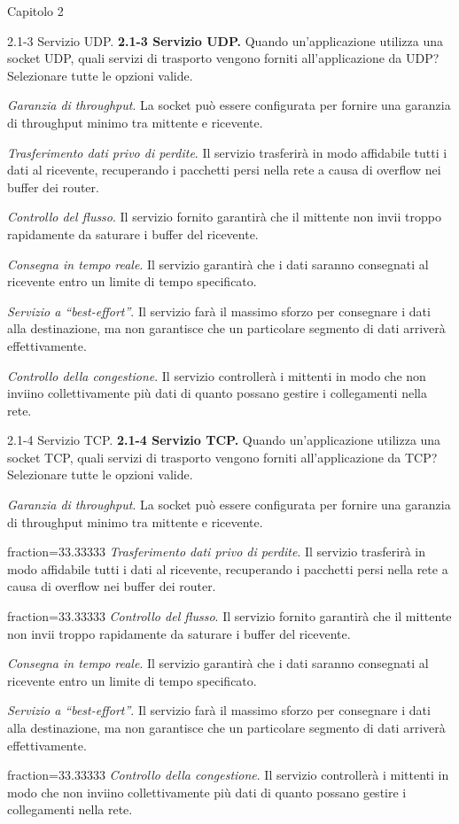\documentclass[a4paper]{article}
\begin{document}
\begin{quiz}{Capitolo 2}
\begin{multi}[points=1,shuffle,multiple]{2.1-3 Servizio UDP.}
\textbf{2.1-3 Servizio UDP.} Quando un'applicazione utilizza una socket UDP, quali servizi di trasporto vengono forniti all'applicazione da UDP? Selezionare tutte le opzioni valide.
\item \emph{Garanzia di throughput}. La socket può essere configurata per fornire una garanzia di throughput minimo tra mittente e ricevente.
\item \emph{Trasferimento dati privo di perdite}. Il servizio trasferirà in modo affidabile tutti i dati al ricevente, recuperando i pacchetti persi nella rete a causa di overflow nei buffer dei router.
\item \emph{Controllo del flusso}. Il servizio fornito garantirà che il mittente non invii troppo rapidamente da saturare i buffer del ricevente.
\item \emph{Consegna in tempo reale}. Il servizio garantirà che i dati saranno consegnati al ricevente entro un limite di tempo specificato.
\item* \emph{Servizio a ``best-effort''}. Il servizio farà il massimo sforzo per consegnare i dati alla destinazione, ma non garantisce che un particolare segmento di dati arriverà effettivamente.
\item \emph{Controllo della congestione}. Il servizio controllerà i mittenti in modo che non inviino collettivamente più dati di quanto possano gestire i collegamenti nella rete.
\end{multi}

\begin{multi}[points=1,shuffle,multiple]{2.1-4 Servizio TCP.}
\textbf{2.1-4 Servizio TCP.} Quando un'applicazione utilizza una socket TCP, quali servizi di trasporto vengono forniti all'applicazione da TCP? Selezionare tutte le opzioni valide.
\item \emph{Garanzia di throughput}. La socket può essere configurata per fornire una garanzia di throughput minimo tra mittente e ricevente.
\item[fraction=33.33333] \emph{Trasferimento dati privo di perdite}. Il servizio trasferirà in modo affidabile tutti i dati al ricevente, recuperando i pacchetti persi nella rete a causa di overflow nei buffer dei router.
\item[fraction=33.33333] \emph{Controllo del flusso}. Il servizio fornito garantirà che il mittente non invii troppo rapidamente da saturare i buffer del ricevente.
\item \emph{Consegna in tempo reale}. Il servizio garantirà che i dati saranno consegnati al ricevente entro un limite di tempo specificato.
\item \emph{Servizio a ``best-effort''}. Il servizio farà il massimo sforzo per consegnare i dati alla destinazione, ma non garantisce che un particolare segmento di dati arriverà effettivamente.
\item[fraction=33.33333] \emph{Controllo della congestione}. Il servizio controllerà i mittenti in modo che non inviino collettivamente più dati di quanto possano gestire i collegamenti nella rete.
\end{multi}


\end{quiz}
\end{document}
